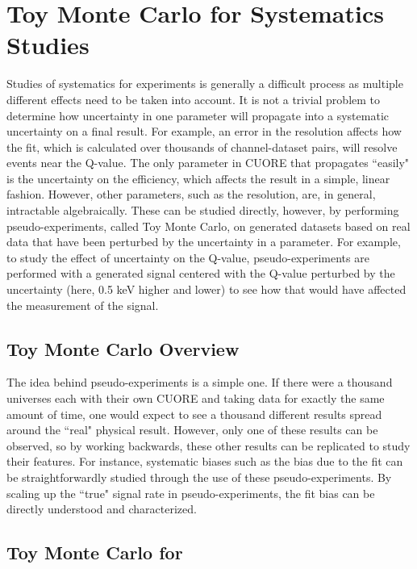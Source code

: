 \chapter{Toy Monte Carlo for Systematics Studies}

Studies of systematics for experiments is generally a difficult process as multiple different effects need to be taken into account.
It is not a trivial problem to determine how uncertainty in one parameter will propagate into a systematic uncertainty on a final result.
For example, an error in the resolution affects how the fit, which is calculated over thousands of channel-dataset pairs, will resolve events near the Q-value.
The only parameter in CUORE that propagates ``easily" is the uncertainty on the efficiency, which affects the result in a simple, linear fashion. However, other parameters, such as the resolution, are, in general, intractable algebraically.
These can be studied directly, however, by performing pseudo-experiments, called Toy Monte Carlo, on generated datasets based on real data that have been perturbed by the uncertainty in a parameter.
For example, to study the effect of uncertainty on the Q-value, pseudo-experiments are performed with a generated signal centered with the Q-value perturbed by the uncertainty (here, 0.5 keV higher and lower) to see how that would have affected the measurement of the signal.


\section{Toy Monte Carlo Overview}

The idea behind pseudo-experiments is a simple one.
If there were a thousand universes each with their own CUORE and taking data for exactly the same amount of time, one would expect to see a thousand different results spread around the ``real" physical result.
However, only one of these results can be observed, so by working backwards, these other results can be replicated to study their features.
For instance, systematic biases such as the bias due to the fit can be straightforwardly studied through the use of these pseudo-experiments.
By scaling up the ``true" signal rate in pseudo-experiments, the fit bias can be directly understood and characterized.

\section{Toy Monte Carlo for \zeronubb}

